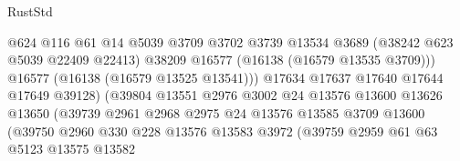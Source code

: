 \begin{lexlean}{RustStd}
\begin{coremodule}
                                          @624
                                          @116
                                          @61
                                          @14
                                          @5039
                                          @3709
                                          @3702
                                          @3739
                                          @13534
                                          @3689
                                          (@38242 @623 @5039 @22409 @22413)
                                          @38209
                                          @16577
                                          (@16138 (@16579 @13535 @3709)))
                                        @16577
                                        (@16138 (@16579 @13525 @13541)))
                                      @17634
                                      @17637
                                      @17640
                                      @17644
                                      @17649
                                      @39128)
                                    (@39804
                                      @13551
                                      @2976
                                      @3002
                                      @24
                                      @13576
                                      @13600
                                      @13626
                                      @13650
                                      (@39739
                                        @2961
                                        @2968
                                        @2975
                                        @24
                                        @13576
                                        @13585
                                        @3709
                                        @13600
                                        (@39750
                                          @2960
                                          @330
                                          @228
                                          @13576
                                          @13583
                                          @3972
                                          (@39759
                                            @2959
                                            @61
                                            @63
                                            @5123
                                            @13575
                                            @13582

\end{coremodule}
\end{lexlean}

